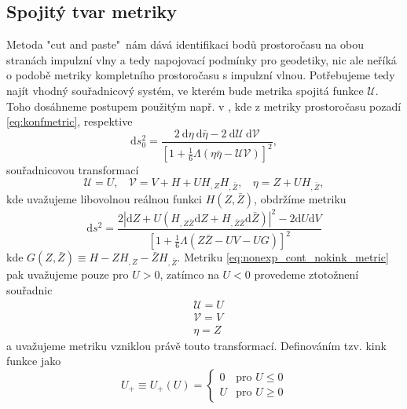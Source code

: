 \subsection{Spojitý tvar metriky}
Metoda "cut and paste"\ nám dává identifikaci bodů prostoročasu na obou stranách impulzní vlny a tedy napojovací podmínky
pro geodetiky, nic ale neříká o podobě metriky kompletního prostoročasu s impulzní vlnou. Potřebujeme tedy najít vhodný
souřadnicový systém, ve kterém bude metrika spojitá funkce $\mathcal{U}$. Toho dosáhneme postupem použitým např. v
\cite{Podolsky:2014ysa}, kde z metriky prostoročasu pozadí \eqref{eq:konfmetric}, respektive
\begin{equation}
    \label{eq:null_background_metric}
    \mathrm{d}s_0^2 = \frac{2~\mathrm{d}\eta~\mathrm{d}\bar{\eta}-2~\mathrm{d}\mathcal{U}~\mathrm{d}\mathcal{V}}
    {\left[1+\frac{1}{6}\Lambda \left(\eta \bar{\eta}
    -\mathcal{U}\mathcal{V}\right)\right]^2},
\end{equation}
souřadnicovou transformací
\begin{equation}
    \label{eq:nonexp_cont_transform}
    \mathcal{U}=U,~~~~ \mathcal{V}=V+H+UH_{,Z}H_{,\bar{Z}},~~~~ \eta=Z+UH_{,\bar{Z}},
\end{equation}
kde uvažujeme libovolnou reálnou funkci $H(Z, \bar{Z})$, obdržíme metriku
\begin{equation}
    \label{eq:nonexp_cont_nokink_metric}
    \mathrm{d} s^{2}=\frac{2\left|\mathrm{d} Z+U\left(H_{, Z \bar{Z}} 
    \mathrm{d} Z+H_{, \bar{Z} \bar{Z}} \mathrm{d} \bar{Z}\right)\right|^{2}-2 \mathrm{d} U 
    \mathrm{d} V}{\left[1+\frac{1}{6} \Lambda(Z \bar{Z}-U V-U G)\right]^{2}}
\end{equation}
kde $G(Z, \bar{Z}) \equiv H - Z H_{,Z}-\bar{Z}H_{,\bar{Z}}$. Metriku \eqref{eq:nonexp_cont_nokink_metric} pak 
uvažujeme pouze pro $U>0$, zatímco na $U<0$ provedeme ztotožnení souřadnic
\begin{equation}
    \label{eq:transformation_just_rename}
    \begin{split}
        &\mathcal{U} = U \\
        &\mathcal{V} = V \\
        &\eta = Z
    \end{split}
\end{equation}
a uvažujeme metriku vzniklou právě touto transformací.
Definováním
tzv. kink funkce jako
\begin{equation}
    \label{eq:kink_function}
    U_+ \equiv U_+(U) = \begin{cases}
        0 & \text{pro } U \leq 0 \\
        U & \text{pro } U \geq 0
    \end{cases}
\end{equation}
